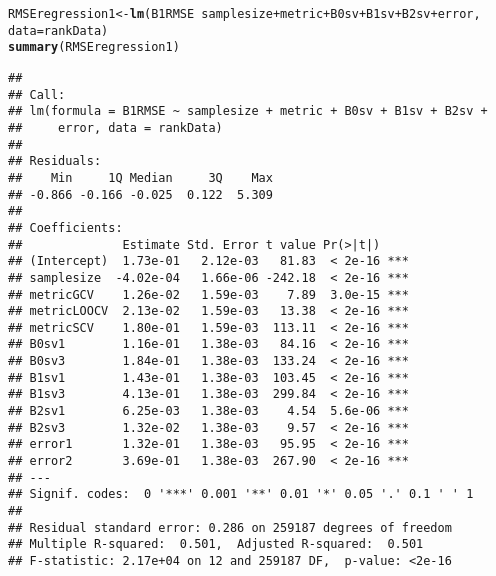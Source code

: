 \documentclass{article}\usepackage[]{graphicx}\usepackage[]{color}
\makeatletter
\newcommand{\hlopt}[1]{\textcolor[rgb]{0,0,0}{#1}}%
\newcommand{\hlstd}[1]{\textcolor[rgb]{0.345,0.345,0.345}{#1}}%
\newcommand{\hlkwb}[1]{\textcolor[rgb]{0.69,0.353,0.396}{#1}}%
\newcommand{\hlkwc}[1]{\textcolor[rgb]{0.333,0.667,0.333}{#1}}%
\newcommand{\hlkwd}[1]{\textcolor[rgb]{0.737,0.353,0.396}{\textbf{#1}}}%
\newenvironment{kframe}{%
 \def\at@end@of@kframe{}%
 \ifinner\ifhmode%
  \def\at@end@of@kframe{\end{minipage}}%
  \begin{minipage}{\columnwidth}%
 \fi\fi%
 \def\FrameCommand##1{\hskip\@totalleftmargin \hskip-\fboxsep
 \colorbox{shadecolor}{##1}\hskip-\fboxsep
     \hskip-\linewidth \hskip-\@totalleftmargin \hskip\columnwidth}%
 \MakeFramed {\advance\hsize-\width
   \@totalleftmargin\z@ \linewidth\hsize
   \@setminipage}}%
 {\par\unskip\endMakeFramed%
 \at@end@of@kframe}
\newenvironment{knitrout}{}{} %
\makeatother
\begin{document}
\begin{knitrout}
\color{fgcolor}\begin{kframe}
\begin{alltt}
\hlstd{RMSEregression1} \hlkwb{<-} \hlkwd{lm}\hlstd{(B1RMSE} \hlopt{~} \hlstd{samplesize} \hlopt{+} \hlstd{metric} \hlopt{+} \hlstd{B0sv} \hlopt{+} \hlstd{B1sv} \hlopt{+} \hlstd{B2sv} \hlopt{+} \hlstd{error,}
    \hlkwc{data} \hlstd{= rankData)}
\hlkwd{summary}\hlstd{(RMSEregression1)}
\end{alltt}
\begin{verbatim}
## 
## Call:
## lm(formula = B1RMSE ~ samplesize + metric + B0sv + B1sv + B2sv + 
##     error, data = rankData)
## 
## Residuals:
##    Min     1Q Median     3Q    Max 
## -0.866 -0.166 -0.025  0.122  5.309 
## 
## Coefficients:
##              Estimate Std. Error t value Pr(>|t|)    
## (Intercept)  1.73e-01   2.12e-03   81.83  < 2e-16 ***
## samplesize  -4.02e-04   1.66e-06 -242.18  < 2e-16 ***
## metricGCV    1.26e-02   1.59e-03    7.89  3.0e-15 ***
## metricLOOCV  2.13e-02   1.59e-03   13.38  < 2e-16 ***
## metricSCV    1.80e-01   1.59e-03  113.11  < 2e-16 ***
## B0sv1        1.16e-01   1.38e-03   84.16  < 2e-16 ***
## B0sv3        1.84e-01   1.38e-03  133.24  < 2e-16 ***
## B1sv1        1.43e-01   1.38e-03  103.45  < 2e-16 ***
## B1sv3        4.13e-01   1.38e-03  299.84  < 2e-16 ***
## B2sv1        6.25e-03   1.38e-03    4.54  5.6e-06 ***
## B2sv3        1.32e-02   1.38e-03    9.57  < 2e-16 ***
## error1       1.32e-01   1.38e-03   95.95  < 2e-16 ***
## error2       3.69e-01   1.38e-03  267.90  < 2e-16 ***
## ---
## Signif. codes:  0 '***' 0.001 '**' 0.01 '*' 0.05 '.' 0.1 ' ' 1
## 
## Residual standard error: 0.286 on 259187 degrees of freedom
## Multiple R-squared:  0.501,	Adjusted R-squared:  0.501 
## F-statistic: 2.17e+04 on 12 and 259187 DF,  p-value: <2e-16
\end{verbatim}
\end{kframe}
\end{knitrout}
\end{document}
